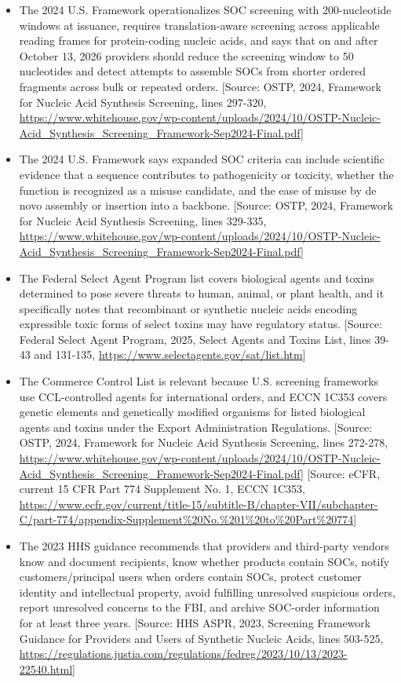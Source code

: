 \documentclass[11pt]{report}
\begin{document}
\begin{itemize}
\item The 2024 U.S. Framework operationalizes SOC screening with 200-nucleotide windows at issuance, requires translation-aware screening across applicable reading frames for protein-coding nucleic acids, and says that on and after October 13, 2026 providers should reduce the screening window to 50 nucleotides and detect attempts to assemble SOCs from shorter ordered fragments across bulk or repeated orders. [Source: OSTP, 2024, Framework for Nucleic Acid Synthesis Screening, lines 297-320, \url{https://www.whitehouse.gov/wp-content/uploads/2024/10/OSTP-Nucleic-Acid_Synthesis_Screening_Framework-Sep2024-Final.pdf}]
\item The 2024 U.S. Framework says expanded SOC criteria can include scientific evidence that a sequence contributes to pathogenicity or toxicity, whether the function is recognized as a misuse candidate, and the ease of misuse by de novo assembly or insertion into a backbone. [Source: OSTP, 2024, Framework for Nucleic Acid Synthesis Screening, lines 329-335, \url{https://www.whitehouse.gov/wp-content/uploads/2024/10/OSTP-Nucleic-Acid_Synthesis_Screening_Framework-Sep2024-Final.pdf}]
\item The Federal Select Agent Program list covers biological agents and toxins determined to pose severe threats to human, animal, or plant health, and it specifically notes that recombinant or synthetic nucleic acids encoding expressible toxic forms of select toxins may have regulatory status. [Source: Federal Select Agent Program, 2025, Select Agents and Toxins List, lines 39-43 and 131-135, \url{https://www.selectagents.gov/sat/list.htm}]
\item The Commerce Control List is relevant because U.S. screening frameworks use CCL-controlled agents for international orders, and ECCN 1C353 covers genetic elements and genetically modified organisms for listed biological agents and toxins under the Export Administration Regulations. [Source: OSTP, 2024, Framework for Nucleic Acid Synthesis Screening, lines 272-278, \url{https://www.whitehouse.gov/wp-content/uploads/2024/10/OSTP-Nucleic-Acid_Synthesis_Screening_Framework-Sep2024-Final.pdf}] [Source: eCFR, current 15 CFR Part 774 Supplement No. 1, ECCN 1C353, \url{https://www.ecfr.gov/current/title-15/subtitle-B/chapter-VII/subchapter-C/part-774/appendix-Supplement\%20No.\%201\%20to\%20Part\%20774}]
\item The 2023 HHS guidance recommends that providers and third-party vendors know and document recipients, know whether products contain SOCs, notify customers/principal users when orders contain SOCs, protect customer identity and intellectual property, avoid fulfilling unresolved suspicious orders, report unresolved concerns to the FBI, and archive SOC-order information for at least three years. [Source: HHS ASPR, 2023, Screening Framework Guidance for Providers and Users of Synthetic Nucleic Acids, lines 503-525, \url{https://regulations.justia.com/regulations/fedreg/2023/10/13/2023-22540.html}]

\end{itemize}
\end{document}
